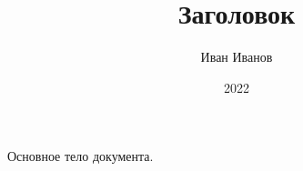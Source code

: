 \documentclass[12pt, a4paper]{article}
\title{Заголовок}
\author{Иван Иванов}
\date{2022}
\begin{document}
\maketitle

Основное тело документа.
\end{document}

